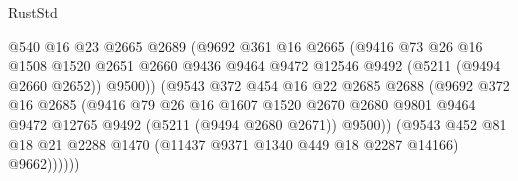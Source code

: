 \begin{lexlean}{RustStd}
\begin{coremodule}
                                  @540
                                  @16
                                  @23
                                  @2665
                                  @2689
                                  (@9692
                                    @361
                                    @16
                                    @2665
                                    (@9416
                                      @73
                                      @26
                                      @16
                                      @1508
                                      @1520
                                      @2651
                                      @2660
                                      @9436
                                      @9464
                                      @9472
                                      @12546
                                      @9492
                                      (@5211 (@9494 @2660 @2652))
                                      @9500))
                                  (@9543
                                    @372
                                    @454
                                    @16
                                    @22
                                    @2685
                                    @2688
                                    (@9692
                                      @372
                                      @16
                                      @2685
                                      (@9416
                                        @79
                                        @26
                                        @16
                                        @1607
                                        @1520
                                        @2670
                                        @2680
                                        @9801
                                        @9464
                                        @9472
                                        @12765
                                        @9492
                                        (@5211 (@9494 @2680 @2671))
                                        @9500))
                                    (@9543
                                      @452
                                      @81
                                      @18
                                      @21
                                      @2288
                                      @1470
                                      (@11437 @9371 @1340 @449 @18 @2287 @14166)
                                      @9662))))))

\end{coremodule}
\end{lexlean}
